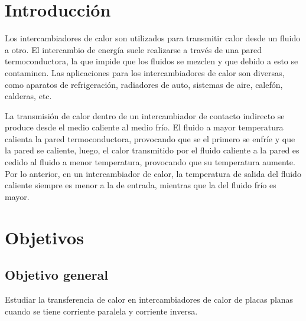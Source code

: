 \documentclass[letterpaper,11pt]{article} %
\begin{document}
	










\section{Introducción}

Los intercambiadores de calor son utilizados para transmitir calor desde un fluido a otro. El intercambio de energía suele realizarse a través de una pared termoconductora, la que impide que los fluidos se mezclen y que debido a esto se contaminen.
\newp 
Las aplicaciones para los intercambiadores de calor son diversas, como aparatos de refrigeración, radiadores de auto, sistemas de aire, calefón, calderas, etc.

\newp
La transmisión de calor dentro de un intercambiador de contacto indirecto se produce desde el medio caliente al medio frío.
El fluido a mayor temperatura calienta la pared termoconductora, provocando que se el primero se enfríe y que la pared se caliente, luego, el calor transmitido por el fluido caliente a la pared es cedido al fluido a menor temperatura, provocando que su temperatura aumente. 
Por lo anterior, en un intercambiador de calor, la temperatura de salida del fluido caliente siempre es menor a la de entrada, mientras que la del fluido frío es mayor.





\newpage
\section{Objetivos}
\subsection{Objetivo general}
Estudiar la transferencia de calor en intercambiadores de calor de placas planas cuando se tiene corriente paralela y corriente inversa.
\end{document}
